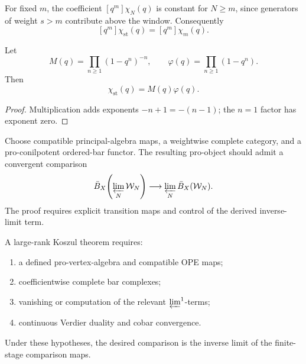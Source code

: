 \begin{computation}
\label{comp:wn-stabilization-windows}
\ClaimStatusProvedHere
For fixed \(m\), the coefficient \([q^m]\chi_N(q)\) is constant for
\(N\ge m\), since generators of weight \(s>m\) contribute above the
window.  Consequently
\[
[q^m]\chi_{\mathrm{st}}(q)=[q^m]\chi_m(q).
\]
\end{computation}

\begin{proposition}
\label{prop:winfty-macmahon-deep}
\ClaimStatusProvedHere
Let
\[
M(q)=\prod_{n\ge1}(1-q^n)^{-n},
\qquad
\varphi(q)=\prod_{n\ge1}(1-q^n).
\]
Then
\begin{equation}
\label{eq:bar-window-series}
\chi_{\mathrm{st}}(q)=M(q)\varphi(q).
\end{equation}
\end{proposition}

\begin{proof}
Multiplication adds exponents \(-n+1=-(n-1)\); the \(n=1\)
factor has exponent zero.
\end{proof}

\begin{conjecture}
\label{conj:w-infty-bar}
\ClaimStatusConjectured
Choose compatible principal-algebra maps, a weightwise complete
category, and a pro-conilpotent ordered-bar functor.  The resulting
pro-object should admit a convergent comparison
\[
\bar B_X\!\left(\varprojlim_N\mathcal W_N\right)
\longrightarrow
\varprojlim_N\bar B_X(\mathcal W_N).
\]
The proof requires explicit transition maps and control of the
derived inverse-limit term.
\end{conjecture}

\begin{theorem}
\label{thm:winfty-factorization-kd}
\ClaimStatusOpen
A large-rank Koszul theorem requires:
\begin{enumerate}[label=\textup{(W\arabic*)}]
\item a defined pro-vertex-algebra and compatible OPE maps;
\item coefficientwise complete bar complexes;
\item vanishing or computation of the relevant
  \(\varprojlim^{1}\)-terms;
\item continuous Verdier duality and cobar convergence.
\end{enumerate}
Under these hypotheses, the desired comparison is the inverse limit
of the finite-stage comparison maps.
\end{theorem}

